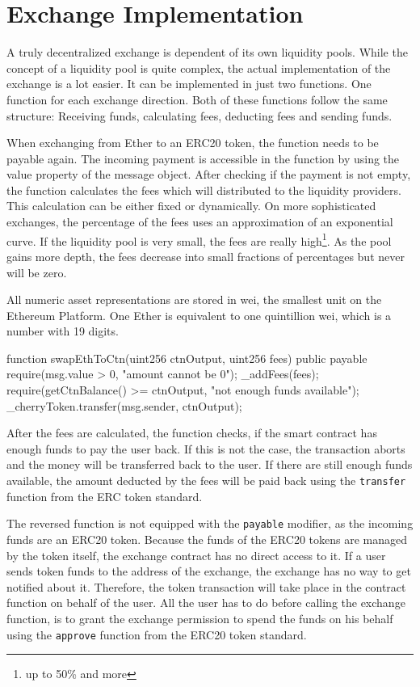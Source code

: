\section{Exchange Implementation}
A truly decentralized exchange is dependent of its own liquidity pools. While the concept of a liquidity pool is quite complex, the actual implementation
of the exchange is a lot easier. It can be implemented in just two functions. One function for each exchange direction. Both of these functions follow
the same structure: Receiving funds, calculating fees, deducting fees and sending funds.

When exchanging from Ether to an ERC20 token, the function needs to be payable again. The incoming payment is accessible in the function by using the value
property of the message object. After checking if the payment is not empty, the function calculates the fees which will distributed to the liquidity providers.
This calculation can be either fixed or dynamically. On more sophisticated exchanges, the percentage of the fees uses an approximation of an exponential curve.
If the liquidity pool is very small, the fees are really high\footnote{up to 50\% and more}. As the pool gains more depth, the fees decrease into small fractions
of percentages but never will be zero.

All numeric asset representations are stored in wei, the smallest unit on the Ethereum Platform. One Ether is equivalent to one quintillion wei, which is a
number with 19 digits.

\begin{GenericCode}
function swapEthToCtn(uint256 ctnOutput, uint256 fees) public payable {
  require(msg.value > 0, "amount cannot be 0");
  _addFees(fees);
  require(getCtnBalance() >= ctnOutput, "not enough funds available");
  _cherryToken.transfer(msg.sender, ctnOutput);
}
\end{GenericCode}

After the fees are calculated, the function checks, if the smart contract has enough funds to pay the user back. If this is not the case, the transaction aborts
and the money will be transferred back to the user. If there are still enough funds available, the amount deducted by the fees will be paid back using the
\texttt{transfer} function from the ERC token standard.

The reversed function is not equipped with the \texttt{payable} modifier, as the incoming funds are an ERC20 token. Because the funds of the ERC20 tokens are
managed by the token itself, the exchange contract has no direct access to it. If a user sends token funds to the address of the exchange, the exchange has no
way to get notified about it. Therefore, the token transaction will take place in the contract function on behalf of the user. All the user has to do before
calling the exchange function, is to grant the exchange permission to spend the funds on his behalf using the \texttt{approve} function from the ERC20 token
standard.

